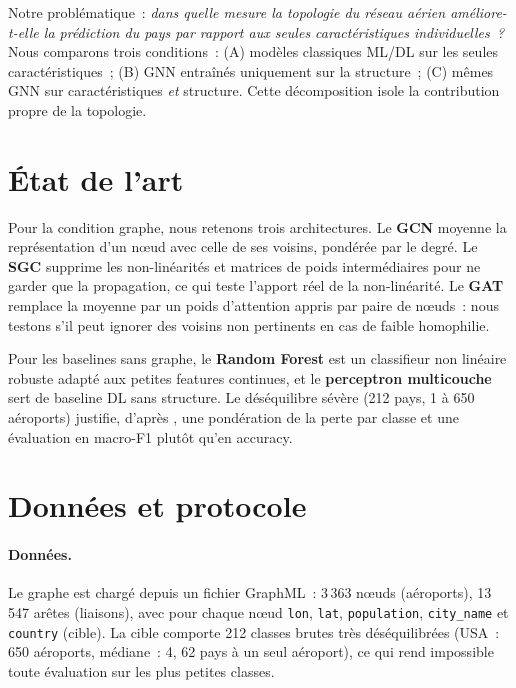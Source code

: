 \documentclass[french]{llncs}
\begin{document}
    Notre problématique~: \emph{dans quelle mesure la topologie du réseau aérien améliore-t-elle
    la prédiction du pays par rapport aux seules caractéristiques individuelles~?} Nous comparons
    trois conditions~: (A) modèles classiques ML/DL sur les seules caractéristiques~; (B) GNN
    entraînés uniquement sur la structure~; (C) mêmes GNN sur caractéristiques \emph{et} structure.
    Cette décomposition isole la contribution propre de la topologie.

    \section{État de l'art} \label{sect:eda}

    Pour la condition graphe, nous retenons trois architectures. Le \textbf{GCN} \cite{Kipf2017}
    moyenne la représentation d'un nœud avec celle de ses voisins, pondérée par le degré. Le
    \textbf{SGC} \cite{Wu2019} supprime les non-linéarités et matrices de poids intermédiaires
    pour ne garder que la propagation, ce qui teste l'apport réel de la non-linéarité. Le
    \textbf{GAT} \cite{Velickovic2018} remplace la moyenne par un poids d'attention appris par
    paire de nœuds~: nous testons s'il peut ignorer des voisins non pertinents en cas de faible
    homophilie.

    Pour les baselines sans graphe, le \textbf{Random Forest} \cite{Breiman2001} est un
    classifieur non linéaire robuste adapté aux petites features continues, et le
    \textbf{perceptron multicouche} \cite{Rumelhart1986} sert de baseline DL sans structure.
    Le déséquilibre sévère (212 pays, 1 à 650 aéroports) justifie, d'après \cite{Wang2021},
    une pondération de la perte par classe et une évaluation en macro-F1 plutôt qu'en accuracy.

    \section{Données et protocole} \label{sect:protocol}

    \paragraph{Données.} Le graphe est chargé depuis un fichier GraphML~: 3\,363 nœuds (aéroports),
    13\,547 arêtes (liaisons), avec pour chaque nœud \texttt{lon}, \texttt{lat}, \texttt{population},
    \texttt{city\_name} et \texttt{country} (cible). La cible comporte 212 classes brutes très
    déséquilibrées (USA~: 650 aéroports, médiane~: 4, 62 pays à un seul aéroport), ce qui rend
    impossible toute évaluation sur les plus petites classes.
\end{document}
